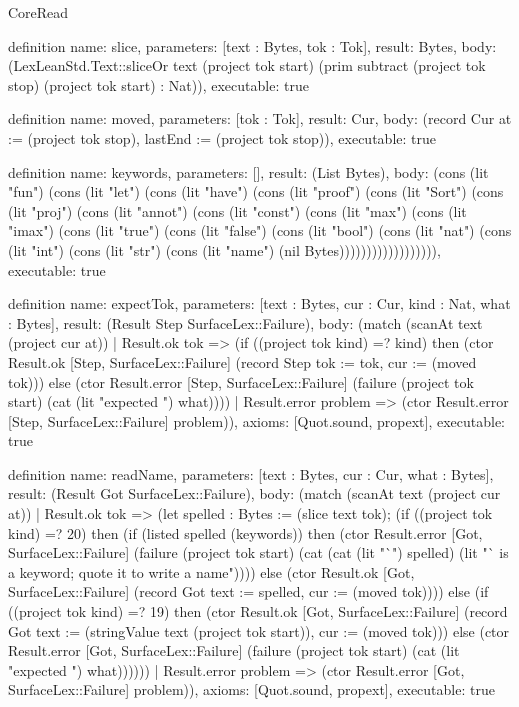 \begin{lexlean}{CoreRead}
\begin{semanticmodule}
definition{
  name: slice,
  parameters: [text : Bytes, tok : Tok],
  result: Bytes,
  body: (LexLeanStd.Text::sliceOr text (project tok start) (prim subtract (project tok stop) (project tok start) : Nat)),
  executable: true
}

definition{
  name: moved,
  parameters: [tok : Tok],
  result: Cur,
  body: (record Cur {at := (project tok stop), lastEnd := (project tok stop)}),
  executable: true
}

definition{
  name: keywords,
  parameters: [],
  result: (List Bytes),
  body: (cons (lit "fun") (cons (lit "let") (cons (lit "have") (cons (lit "proof") (cons (lit "Sort") (cons (lit "proj") (cons (lit "annot") (cons (lit "const") (cons (lit "max") (cons (lit "imax") (cons (lit "true") (cons (lit "false") (cons (lit "bool") (cons (lit "nat") (cons (lit "int") (cons (lit "str") (cons (lit "name") (nil Bytes)))))))))))))))))),
  executable: true
}

definition{
  name: expectTok,
  parameters: [text : Bytes, cur : Cur, kind : Nat, what : Bytes],
  result: (Result Step SurfaceLex::Failure),
  body: (match (scanAt text (project cur at))
    | Result.ok tok => (if ((project tok kind) =? kind) then (ctor Result.ok [Step, SurfaceLex::Failure] (record Step {tok := tok, cur := (moved tok)})) else (ctor Result.error [Step, SurfaceLex::Failure] (failure (project tok start) (cat (lit "expected ") what))))
    | Result.error problem => (ctor Result.error [Step, SurfaceLex::Failure] problem)),
  axioms: [Quot.sound, propext],
  executable: true
}

definition{
  name: readName,
  parameters: [text : Bytes, cur : Cur, what : Bytes],
  result: (Result Got SurfaceLex::Failure),
  body: (match (scanAt text (project cur at))
    | Result.ok tok => (let spelled : Bytes := (slice text tok); (if ((project tok kind) =? 20) then (if (listed spelled (keywords)) then (ctor Result.error [Got, SurfaceLex::Failure] (failure (project tok start) (cat (cat (lit "`") spelled) (lit "` is a keyword; quote it to write a name")))) else (ctor Result.ok [Got, SurfaceLex::Failure] (record Got {text := spelled, cur := (moved tok)}))) else (if ((project tok kind) =? 19) then (ctor Result.ok [Got, SurfaceLex::Failure] (record Got {text := (stringValue text (project tok start)), cur := (moved tok)})) else (ctor Result.error [Got, SurfaceLex::Failure] (failure (project tok start) (cat (lit "expected ") what))))))
    | Result.error problem => (ctor Result.error [Got, SurfaceLex::Failure] problem)),
  axioms: [Quot.sound, propext],
  executable: true
}


\end{semanticmodule}
\end{lexlean}
